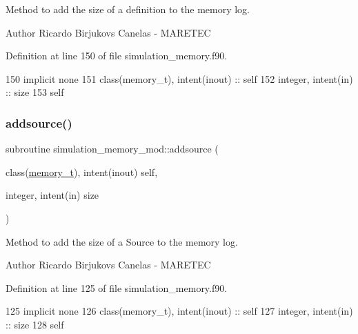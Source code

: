 Method to add the size of a definition to the memory log. 

\begin{DoxyAuthor}{Author}
Ricardo Birjukovs Canelas -\/ M\+A\+R\+E\+T\+EC 
\end{DoxyAuthor}


Definition at line 150 of file simulation\+\_\+memory.\+f90.


\begin{DoxyCode}
150     \textcolor{keywordtype}{implicit none}
151     \textcolor{keywordtype}{class}(memory\_t), \textcolor{keywordtype}{intent(inout)} :: self
152     \textcolor{keywordtype}{integer}, \textcolor{keywordtype}{intent(in)} :: size
153     self%
\end{DoxyCode}
\mbox{\label{namespacesimulation__memory__mod_a940ff42fa3a49423f9ac98da2bffa54c}} 
\subsubsection{\texorpdfstring{addsource()}{addsource()}}
{\footnotesize\ttfamily subroutine simulation\+\_\+memory\+\_\+mod\+::addsource (\begin{DoxyParamCaption}\item[{class(\mbox{\hyperlink{structsimulation__memory__mod_1_1memory__t}{memory\+\_\+t}}), intent(inout)}]{self,  }\item[{integer, intent(in)}]{size }\end{DoxyParamCaption})\hspace{0.3cm}{\ttfamily [private]}}



Method to add the size of a Source to the memory log. 

\begin{DoxyAuthor}{Author}
Ricardo Birjukovs Canelas -\/ M\+A\+R\+E\+T\+EC 
\end{DoxyAuthor}


Definition at line 125 of file simulation\+\_\+memory.\+f90.


\begin{DoxyCode}
125     \textcolor{keywordtype}{implicit none}
126     \textcolor{keywordtype}{class}(memory\_t), \textcolor{keywordtype}{intent(inout)} :: self
127     \textcolor{keywordtype}{integer}, \textcolor{keywordtype}{intent(in)} :: size
128     self%
\end{DoxyCode}
\mbox{\label{namespacesimulation__memory__mod_acf04d6b930ed3ffbc0950afd86033c51}} 
